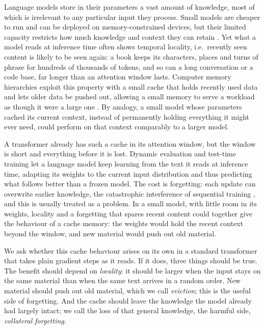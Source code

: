 \documentclass[10pt]{article}
\begin{document}
Language models store in their parameters a vast amount of knowledge, most of which is irrelevant to any particular input they process.
Small models are cheaper to run and can be deployed on memory-constrained devices, but their limited capacity restricts how much knowledge and context they can retain \cite{liu2024mobilellm}.
Yet what a model reads at inference time often shows temporal locality, i.e.\ recently seen content is likely to be seen again: a book keeps its characters, places and turns of phrase for hundreds of thousands of tokens, and so can a long conversation or a code base, far longer than an attention window lasts.
Computer memory hierarchies exploit this property with a small cache that holds recently used data and lets older data be pushed out, allowing a small memory to serve a workload as though it were a large one \cite{denning1968working}.
By analogy, a small model whose parameters cached its current context, instead of permanently holding everything it might ever need, could perform on that context comparably to a larger model.

A transformer already has such a cache in its attention window, but the window is short and everything before it is lost.
Dynamic evaluation \cite{krause2018dynamic,krause2019dynamic,rannentriki2024revisiting} and test-time training \cite{feng2026inplace,bansal2026lets,tandon2025endtoend} let a language model keep learning from the text it reads at inference time, adapting its weights to the current input distribution and thus predicting what follows better than a frozen model.
The cost is forgetting: each update can overwrite earlier knowledge, the catastrophic interference of sequential training \cite{mccloskey1989catastrophic}, and this is usually treated as a problem.
In a small model, with little room in its weights, locality and a forgetting that spares recent content could together give the behaviour of a cache memory: the weights would hold the recent context beyond the window, and new material would push out old material.

We ask whether this cache behaviour arises on its own in a standard transformer that takes plain gradient steps as it reads.
If it does, three things should be true.
The benefit should depend on \emph{locality}: it should be larger when the input stays on the same material than when the same text arrives in a random order.
New material should push out old material, which we call \emph{eviction}; this is the useful side of forgetting.
And the cache should leave the knowledge the model already had largely intact; we call the loss of that general knowledge, the harmful side, \emph{collateral forgetting}.
\end{document}
